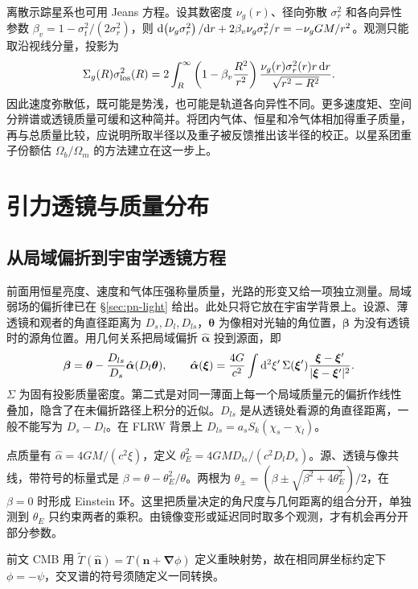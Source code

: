 离散示踪星系也可用 Jeans 方程。设其数密度 $\nu_g(r)$、径向弥散 $\sigma_r^2$ 和各向异性参数 $\beta_v=1-\sigma_t^2/(2\sigma_r^2)$，则 $\dd(\nu_g\sigma_r^2)/\dd r+2\beta_v\nu_g\sigma_r^2/r=-\nu_gGM/r^2$。观测只能取沿视线分量，投影为
\[
 \Sigma_g(R)\sigma_{\rm los}^2(R)
 =2\int_R^\infty\left(1-\beta_v\frac{R^2}{r^2}\right)
       \frac{\nu_g(r)\sigma_r^2(r)r\,\dd r}{\sqrt{r^2-R^2}}.
\]
因此速度弥散低，既可能是势浅，也可能是轨道各向异性不同。更多速度矩、空间分辨谱或透镜质量可缓和这种简并。将团内气体、恒星和冷气体相加得重子质量，再与总质量比较，应说明所取半径以及重子被反馈推出该半径的校正。以星系团重子份额估 $\Omega_b/\Omega_m$ 的方法建立在这一步上。

\section{引力透镜与质量分布}\label{sec:cosmo-lensing}

\subsection{从局域偏折到宇宙学透镜方程}

前面用恒星亮度、速度和气体压强称量质量，光路的形变又给一项独立测量。局域弱场的偏折律已在 \S\ref{sec:pn-light} 给出。此处只将它放在宇宙学背景上。设源、薄透镜和观者的角直径距离为 $D_s,D_l,D_{ls}$，$\bm\theta$ 为像相对光轴的角位置，$\bm\beta$ 为没有透镜时的源角位置。用几何关系把局域偏折 $\hat{\bm\alpha}$ 投到源面，即
\begin{equation}\label{eq:cosmo-lenseq}
 \bm\beta=\bm\theta-\frac{D_{ls}}{D_s}\hat{\bm\alpha}(D_l\bm\theta),\qquad
 \hat{\bm\alpha}(\bm\xi)=\frac{4G}{c^2}\int
       \dd^2\xi'\,\Sigma(\bm\xi')
          \frac{\bm\xi-\bm\xi'}{|\bm\xi-\bm\xi'|^2}.
\end{equation}
$\Sigma$ 为固有投影质量密度。第二式是对同一薄面上每一个局域质量元的偏折作线性叠加，隐含了在未偏折路径上积分的近似。$D_{ls}$ 是从透镜处看源的角直径距离，一般不能写为 $D_s-D_l$。在 FLRW 背景上 $D_{ls}=a_s S_k(\chi_s-\chi_l)$。

点质量有 $\hat\alpha=4GM/(c^2\xi)$，定义 $\theta_E^2=4GMD_{ls}/(c^2D_lD_s)$。源、透镜与像共线，带符号的标量式是 $\beta=\theta-\theta_E^2/\theta$。两根为 $\theta_\pm=(\beta\pm\sqrt{\beta^2+4\theta_E^2})/2$，在 $\beta=0$ 时形成 Einstein 环。这里把质量决定的角尺度与几何距离的组合分开，单独测到 $\theta_E$ 只约束两者的乘积。由镜像变形或延迟同时取多个观测，才有机会再分开部分参数。

前文 CMB 用 $\widetilde T(\hat{\bm n})=T(\hat{\bm n}+\bm\nabla\phi)$ 定义重映射势，故在相同屏坐标约定下 $\phi=-\psi$，交叉谱的符号须随定义一同转换。

